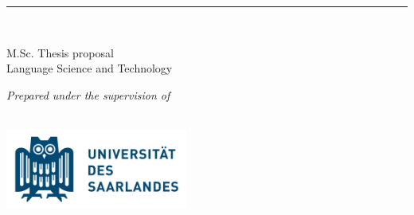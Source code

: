 %
\begin{titlepage}
	\tgherosfont
	\flushright
	\hfill
	\vfill
	
	{\color{ctcolormain}
	{\LARGE\textbf{\thesisTitle}} \par
	{\Large \thesisSubtitle} \par
	} %
	
	\rule[5pt]{\textwidth}{.4pt} \par
	
	{\LARGE \authorName} \\[2mm]

	\vfill
	
	{\large
	M.Sc. Thesis proposal \\[1mm]
	Language Science and Technology \\
	}	
	
%	
	\vfill	
	
	\textit{Prepared under the supervision of} \\
	\thesisFirstSupervisor \\
	\thesisSecondSupervisor 
	
	\vfill
	
	
	\includegraphics[width=6cm]{../img/uni_des_saarlandes} \\[2mm]
	{\Large \thesisUniversity} \\[2mm]
	{\large \thesisUniversityDepartment} \\
	
	\vfill
	
	\thesisDate \\
	
\end{titlepage}

\setcounter{tocdepth}{3}		%
\tableofcontents